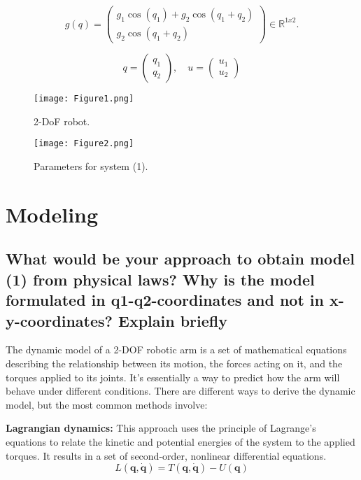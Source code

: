 \documentclass[a4paper, 12pt]{report}
\begin{document}
\[g(q) = \begin{pmatrix}g_1 \cos(q_1) + g_2 \cos(q_1 + q_2) \\g_2 \cos(q_1 + q_2)\end{pmatrix}\in \mathbb{R}^{1x2}.\]

\[
q = \begin{pmatrix}
q_1 \\
q_2
\end{pmatrix}, \quad
u = \begin{pmatrix}
u_1 \\
u_2
\end{pmatrix}
\]

\begin{figure}[h]
  \begin{minipage}[b]{0.3\linewidth}
    \centering
    \texttt{[image: Figure1.png]}
    \caption{2-DoF robot.}
    \label{fig:Figure1}
  \end{minipage}%
  \begin{minipage}[b]{0.7\linewidth}
    \centering
    \texttt{[image: Figure2.png]}
    \caption{Parameters for system (1).}
    \label{tab:example}
  \end{minipage}
\end{figure}

\section{Modeling}

\subsection{What would be your approach to obtain model (1) from physical laws? Why is the model formulated in q1-q2-coordinates and not in x-y-coordinates? Explain briefly}

The dynamic model of a 2-DOF robotic arm is a set of mathematical equations describing the relationship between its motion, the forces acting on it, and the torques applied to its joints. It's essentially a way to predict how the arm will behave under different conditions. There are different ways to derive the dynamic model, but the most common methods involve:

\textbf{Lagrangian dynamics:} This approach uses the principle of Lagrange's equations to relate the kinetic and potential energies of the system to the applied torques. It results in a set of second-order, nonlinear differential equations.
$$L(\mathbf{q},\mathbf {\dot{q}})=T(\mathbf{q},\mathbf{\dot{q}})-U(\mathbf{q})$$
 
\end{document}
